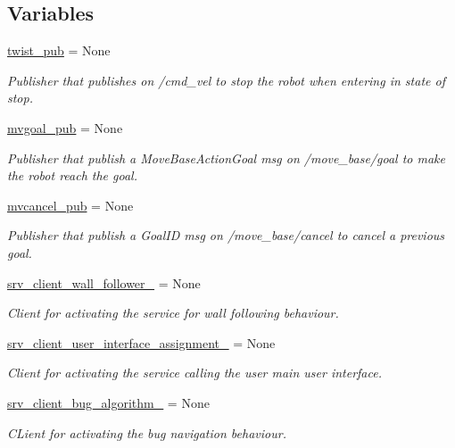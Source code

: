 \subsection*{Variables}
\begin{DoxyCompactItemize}
\item 
\hyperlink{namespacebig__brain_a9f12d1c3982160fe18122c7a2c4aa860}{twist\+\_\+pub} = None
\begin{DoxyCompactList}\small\item\em Publisher that publishes on /cmd\+\_\+vel to stop the robot when entering in state of \textquotesingle{}stop\textquotesingle{}. \end{DoxyCompactList}\item 
\hyperlink{namespacebig__brain_a757b56b184f850f2599be2279ac94777}{mvgoal\+\_\+pub} = None
\begin{DoxyCompactList}\small\item\em Publisher that publish a Move\+Base\+Action\+Goal msg on /move\+\_\+base/goal to make the robot reach the goal. \end{DoxyCompactList}\item 
\hyperlink{namespacebig__brain_acbbe2e86c0b737f0caaff69ce22b4aa8}{mvcancel\+\_\+pub} = None
\begin{DoxyCompactList}\small\item\em Publisher that publish a Goal\+ID msg on /move\+\_\+base/cancel to cancel a previous goal. \end{DoxyCompactList}\item 
\hyperlink{namespacebig__brain_a954157b5770aed51dc667611f39855b0}{srv\+\_\+client\+\_\+wall\+\_\+follower\+\_\+} = None
\begin{DoxyCompactList}\small\item\em Client for activating the service for wall following behaviour. \end{DoxyCompactList}\item 
\hyperlink{namespacebig__brain_a946162ac048b8df1f02003b37bd96812}{srv\+\_\+client\+\_\+user\+\_\+interface\+\_\+assignment\+\_\+} = None
\begin{DoxyCompactList}\small\item\em Client for activating the service calling the user main user interface. \end{DoxyCompactList}\item 
\hyperlink{namespacebig__brain_a60d3104e99b35d213a90529c7bc5a573}{srv\+\_\+client\+\_\+bug\+\_\+algorithm\+\_\+} = None
\begin{DoxyCompactList}\small\item\em C\+Lient for activating the bug navigation behaviour. \end{DoxyCompactList}\item 

\end{DoxyCompactItemize}
